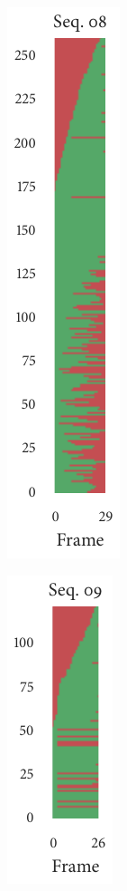 \begin{figure}[t]
\begin{subfigure}[b]{0.2\textwidth}
		\includegraphics{missingness_sequence08.pdf}
	\end{subfigure}%
	\begin{subfigure}[b]{0.2\textwidth}
		\centering
		\includegraphics{missingness_sequence09.pdf}
	\end{subfigure}%
	\begin{subfigure}[b]{0.2\textwidth}

\end{subfigure}
\end{figure}
